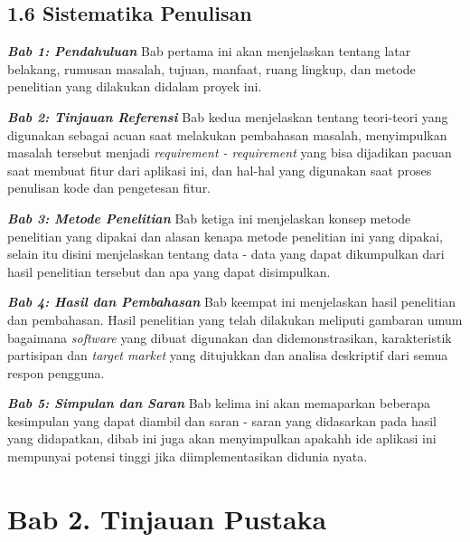 \documentclass[a4paper]{article}
\begin{document}
\subsection*{1.6 Sistematika Penulisan}
\textit{\textbf{Bab 1: Pendahuluan}} \newline
Bab pertama ini akan menjelaskan tentang latar belakang, rumusan masalah, tujuan, manfaat, ruang lingkup, dan metode penelitian yang dilakukan didalam proyek ini.

\textit{\textbf{Bab 2: Tinjauan Referensi}}\newline
Bab kedua menjelaskan tentang teori-teori yang digunakan sebagai acuan saat melakukan pembahasan masalah, menyimpulkan masalah tersebut menjadi \textit{requirement - requirement} yang bisa dijadikan pacuan saat membuat fitur dari aplikasi ini, dan hal-hal yang digunakan saat proses penulisan kode dan pengetesan fitur.

\textit{\textbf{Bab 3: Metode Penelitian}}\newline
Bab ketiga ini menjelaskan konsep metode penelitian yang dipakai dan alasan kenapa metode penelitian ini yang dipakai, selain itu disini menjelaskan tentang data - data yang dapat dikumpulkan dari hasil penelitian tersebut dan apa yang dapat disimpulkan.

\textit{\textbf{Bab 4: Hasil dan Pembahasan}}\newline
Bab keempat ini menjelaskan hasil penelitian dan pembahasan. Hasil penelitian yang telah dilakukan meliputi gambaran umum bagaimana \textit{software} yang dibuat digunakan dan didemonstrasikan, karakteristik partisipan dan \textit{target market} yang ditujukkan dan analisa deskriptif dari semua respon pengguna.

\textit{\textbf{Bab 5: Simpulan dan Saran}}\newline
Bab kelima ini akan memaparkan beberapa kesimpulan yang dapat diambil dan saran - saran yang didasarkan pada hasil yang didapatkan, dibab ini juga akan menyimpulkan apakahh ide aplikasi ini mempunyai potensi tinggi jika diimplementasikan didunia nyata.

\newpage
\section*{Bab 2. Tinjauan Pustaka}
\end{document}
